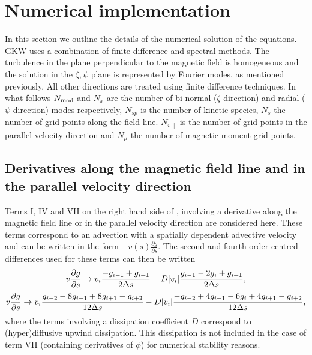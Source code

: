 \chapter{Numerical implementation}

In this section we outline the details of the numerical solution of the equations. GKW uses a combination of finite difference and spectral methods.
The turbulence in the plane perpendicular to the magnetic field is homogeneous and the
solution in the $\zeta, \psi$ plane is represented by Fourier modes, as mentioned
previously. All other directions are treated using finite difference techniques.
In what follows $N_{\rm mod}$ and $N_x$ are the number of bi-normal ($\zeta$ direction) and radial ($\psi$ direction) modes
respectively, $N_{sp}$ is the number of kinetic species, $N_s$ the number of grid points along the field line. $N_{v\parallel}$ is the number of grid points 
in the parallel velocity direction and $N_\mu$ the number of magnetic moment grid points. 

\section{Derivatives along the magnetic field line and in the parallel velocity
direction}
\label{sec:finite-differences}
Terms I, IV and VII on the right hand side of , involving a derivative along the magnetic field line or in the parallel velocity direction are considered
here. These terms correspond to an advection with a spatially dependent advective velocity
and can be written in the form $-v(s)\frac{\partial g}{\partial s}$. The second and fourth-order centred-differences used for these
terms can then be written
\begin{equation} 
v {\partial g \over \partial s} \rightarrow v_i {- g_{i-1} + g_{i+1} \over 2 \Delta s} 
- D \vert v_i \vert {g_{i-1} - 2 g_i + g_{i+1} \over 2 \Delta s},
\label{eq:s-2nd-order}
\end{equation} 
\begin{align}
v {\partial g \over \partial s}  \rightarrow  v_i {g_{i-2} - 8 g_{i-1} + 8 g_{i+1} -g_{i+2} \over 
12 \Delta s}
 - D \vert v_i \vert {- g_{i-2} + 4 g_{i-1} - 6 g_i + 4 g_{i+1}-g_{i+2} \over 12 \Delta s},  
\label{eq:s-4th-order}
\end{align}
where the terms involving a dissipation coefficient $D$ correspond to (hyper)diffusive upwind dissipation. This dissipation is
not included in the case of term VII (containing derivatives of $\phi$) for numerical stability reasons.

